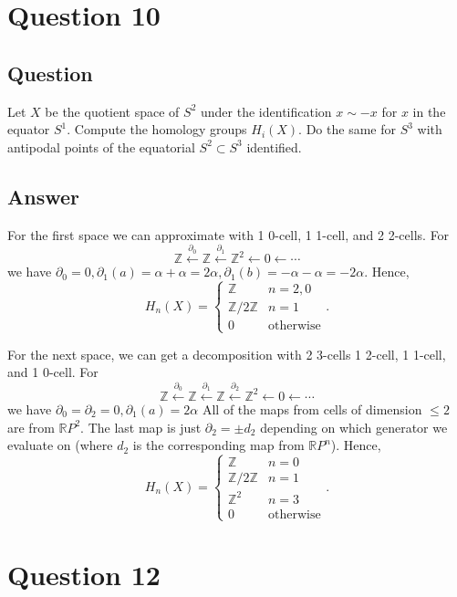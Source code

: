 \documentclass[11pt]{article}
\begin{document}
\section{Question 10}
\subsection{Question}
Let $X$ be the quotient space of $S^2$ under the identification $x \sim -x$ for $x$ in the equator $S^1$. Compute the homology groups $H_i(X)$. Do the same  for $S^3$ with antipodal points of the equatorial $S^2 \subset S^3$ identified.
\subsection{Answer}
For the first space we can approximate with 1 0-cell, 1 1-cell, and 2 2-cells. For
\[\mathbb{Z} \stackrel{\partial_0}{\leftarrow} \mathbb{Z} \stackrel{\partial_1}{\leftarrow} \mathbb{Z}^2 \leftarrow 0 \leftarrow \cdots\]
we have $\partial_0 =0, \partial_1(a) = \alpha + \alpha =2 \alpha, \partial_1(b) = -\alpha - \alpha = - 2 \alpha$. Hence,
\[H_n(X) = \left\{ \begin{array}{ll} \mathbb{Z} & n = 2,0 \\ \mathbb{Z}/2\mathbb{Z}& n=1\\ 0&\mbox{otherwise} \end{array} . \right.\]

For the next space, we can get a decomposition with 2 3-cells 1 2-cell, 1 1-cell, and 1 0-cell. For 
\[\mathbb{Z} \stackrel{\partial_0}{\leftarrow} \mathbb{Z} \stackrel{\partial_1}{\leftarrow} \mathbb{Z}  \stackrel{\partial_2}{\leftarrow} \mathbb{Z}^2 \leftarrow 0 \leftarrow \cdots\]
we have $\partial_0  = \partial_2=0, \partial_1(a) = 2\alpha $  All of the maps from cells of dimension $\leq 2 $ are from $\mathbb{R}P^2$.  The last map is just $\partial_2 =\pm d_2$ depending on which generator we evaluate on (where $d_2$ is the corresponding map from $\mathbb{R}P^n$). Hence,
\[H_n(X) = \left\{ \begin{array}{ll} \mathbb{Z} & n = 0\\ \mathbb{Z}/2\mathbb{Z} & n=1 \\ \mathbb{Z}^2 & n=3 \\ 0& \mbox{otherwise} \end{array} . \right.\]

\section{Question 12}
\end{document}
